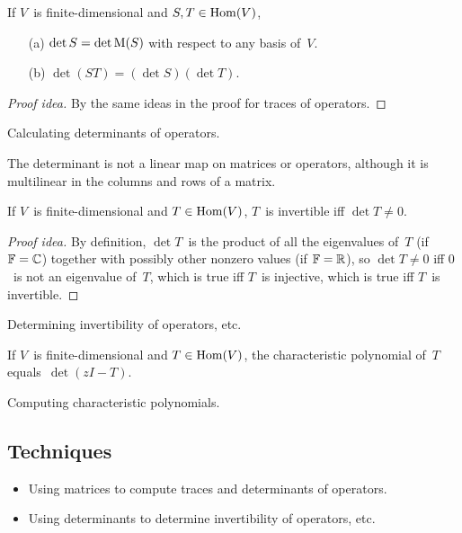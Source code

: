 \begin{thm}
If \(V\)~is finite-dimensional and \(S,T\in\operatorname{Hom}(V)\),
\begin{enumerate}[itemsep=0pt]
\item[(a)] \(\det S=\det\operatorname{M}(S)\) with respect to any basis of~\(V\).
\item[(b)] \(\det(ST)=(\det S)(\det T)\).
\end{enumerate}
\end{thm}
\begin{proof}[Proof idea]
By the same ideas in the proof for traces of operators.
\end{proof}
\begin{app}
Calculating determinants of operators.
\end{app}

\begin{rmk}
The determinant is not a linear map on matrices or operators, although it is multilinear in the columns and rows of a matrix.
\end{rmk}

\begin{thm}
If \(V\)~is finite-dimensional and \(T\in\operatorname{Hom}(V)\), \(T\)~is invertible iff \(\det T\ne0\).
\end{thm}
\begin{proof}[Proof idea]
By definition, \(\det T\)~is the product of all the eigenvalues of~\(T\) (if \(\mathbb{F}=\mathbb{C}\)) together with possibly other nonzero values (if \(\mathbb{F}=\mathbb{R}\)), so \(\det T\ne0\) iff \(0\)~is not an eigenvalue of~\(T\), which is true iff \(T\)~is injective, which is true iff \(T\)~is invertible.
\end{proof}
\begin{app}
Determining invertibility of operators, etc.
\end{app}

\begin{thm}
If \(V\)~is finite-dimensional and \(T\in\operatorname{Hom}(V)\), the characteristic polynomial of~\(T\) equals~\(\det(zI-T)\).
\end{thm}
\begin{app}
Computing characteristic polynomials.
\end{app}

\subsection*{Techniques}
\begin{itemize}[itemsep=0pt]
\item Using matrices to compute traces and determinants of operators.
\item Using determinants to determine invertibility of operators, etc.
\end{itemize}
